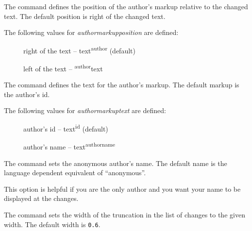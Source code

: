 



The command  defines the position of the author's markup relative to the changed text.
The default position is right of the changed text.

The following values for \emph{authormarkupposition} are defined:

\begin{description}
	\item [] right of the text -- text\textsuperscript{author} (default)
	\item [] left of the text -- \textsuperscript{author}text
\end{description}





The command  defines the text for the author's markup.
The default markup is the author's id.

The following values for \emph{authormarkuptext} are defined:

\begin{description}
	\item [] author's id -- text\textsuperscript{id} (default)
	\item [] author's name -- text\textsuperscript{authorname}
\end{description}





The command  sets the anonymous author's name.
The default name is the language dependent equivalent of ``anonymous''.

This option is helpful if you are the only author and you want your name to be displayed at the changes.





The command  sets the width of the truncation in the list of changes to the given width.
The default width is \texttt{0.6}.


